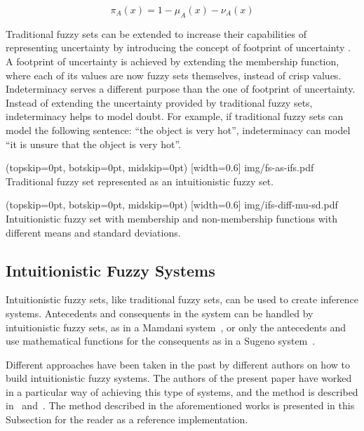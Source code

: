 \documentclass{ieeeaccess}
\begin{document}
\begin{equation}
  \label{eq:indeterminacy}
  \pi_{A}(x) = 1 - \mu_{A}(x) - \nu_{A}(x)
\end{equation}

Traditional fuzzy sets can be extended to increase their capabilities of
representing uncertainty by introducing the concept of footprint of
uncertainty \cite{Mendel2002} \cite{Mendel2006}. A footprint of uncertainty is achieved by extending the membership
function, where each of its values are now fuzzy sets themselves, instead of
crisp values. Indeterminacy serves a different purpose than the one of footprint
of uncertainty. Instead of extending the uncertainty provided by traditional
fuzzy sets, indeterminacy helps to model doubt. For example, if traditional
fuzzy sets can model the following sentence: ``the object is very hot'',
indeterminacy can model ``it is unsure that the object is very hot''.

\Figure[](topskip=0pt, botskip=0pt, midskip=0pt)
[width=0.6\linewidth]
{img/fs-as-ifs.pdf}
{Traditional fuzzy set represented as an intuitionistic fuzzy set.
  \label{figure:fs-as-ifs}}

\Figure[](topskip=0pt, botskip=0pt, midskip=0pt)
[width=0.6\linewidth]
{img/ifs-diff-mu-sd.pdf}
{Intuitionistic fuzzy set with membership and non-membership functions with different means and standard deviations.
  \label{figure:ifs-diff-mu-sd}}

\subsection{Intuitionistic Fuzzy Systems}
\label{subsection:intuitionistic-fuzzy-systems}

Intuitionistic fuzzy sets, like traditional fuzzy sets, can be used to create
inference systems. Antecedents and consequents in the system can be handled by
intuitionistic fuzzy sets, as in a Mamdani system~\cite{Mamdani1975}, or only
the antecedents and use mathematical functions for the consequents as in a
Sugeno system~\cite{Takagi1985}.

Different approaches have been taken in the past by different authors on how to
build intuitionistic fuzzy systems. The authors of the present paper have worked
in a particular way of achieving this type of systems, and the method is
described in~\cite{Hernandez-Aguila2016} and~\cite{Hernandez-Aguila2017-2}. The
method described in the aforementioned works is presented in this Subsection for
the reader as a reference implementation.
\end{document}
